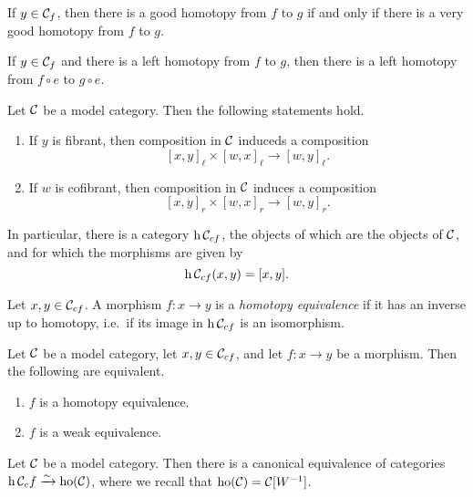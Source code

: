 \begin{lemma}
	If \(y\in\mathcal{C}_f\), then there is a good homotopy from \(f\) to \(g\) if and only if there is a very good homotopy from \(f\) to \(g\).
\end{lemma}
\begin{proposition}
	If \(y\in\mathcal{C}_f\) and there is a left homotopy from \(f\) to \(g\), then there is a left homotopy from \(f\circ e\) to \(g\circ e\).
\end{proposition}
\begin{propositiondef}
	Let \(\mathcal{C}\) be a model category. Then the following statements hold.
	\begin{enumerate}[label=(\arabic*)]
		\item If \(y\) is fibrant, then composition in \(\mathcal{C}\) induceds a composition
			\[ [x,y]_\ell \times [w,x]_\ell \to [w,y]_\ell. \]
		\item If \(w\) is cofibrant, then composition in \(\mathcal{C}\) induces a composition
			\[ [x,y]_r \times [w,x]_r \to [w,y]_r. \]
	\end{enumerate}
	In particular, there is a category \(\operatorname{h}{\mathcal{C}_{cf}}\), the objects of which are the objects of \(\mathcal{C}\), and for which the morphisms are given by
	\[ \operatorname{h}{\mathcal{C}_{cf}}(x,y) = [x,y]. \]
\end{propositiondef}

\begin{terminology}
	Let \(x,y\in\mathcal{C}_{cf}\). A morphism \(f\!:x\to y\) is a \emph{homotopy equivalence} if it has an inverse up to homotopy, i.e.\ if its image in \(\operatorname{h}{\mathcal{C}_{cf}}\)
	is an isomorphism.
\end{terminology}

\begin{theorem}
	Let \(\mathcal{C}\) be a model category, let \(x,y\in\mathcal{C}_{cf}\), and let \(f\!:x\to y\) be a morphism. Then the following are equivalent.
	\begin{enumerate}[label=(\arabic*)]
		\item \(f\) is a homotopy equivalence.
		\item \(f\) is a weak equivalence.
	\end{enumerate}
\end{theorem}

\begin{theorem}
	Let \(\mathcal{C}\) be a model category. Then there is a canonical equivalence of categories \(\operatorname{h}{\mathcal{C}_cf} \xrightarrow{\sim} \operatorname{ho}(\mathcal{C})\), where we recall that \(\operatorname{ho}(\mathcal{C}) = \mathcal{C}[W^{-1}]\).
\end{theorem}

